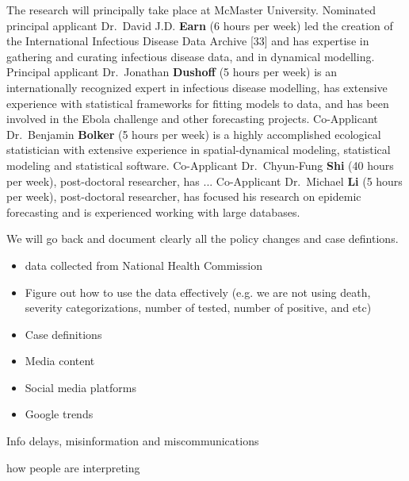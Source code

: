 The research will principally take place at McMaster University. 
Nominated principal applicant Dr.\ David J.D. \textbf{Earn} (6 hours per week) led the creation of the International Infectious Disease Data Archive [33] and has expertise in gathering and curating infectious disease data, and in dynamical modelling.
Principal applicant Dr.\ Jonathan \textbf{Dushoff} (5 hours per week) is an internationally recognized expert in infectious disease modelling, has extensive experience with statistical frameworks for fitting models to data, and has been involved in the Ebola challenge and other forecasting projects. 
Co-Applicant Dr.\ Benjamin \textbf{Bolker} (5 hours per week) is a highly accomplished ecological statistician with extensive experience in spatial-dynamical modeling, statistical modeling and statistical software.
Co-Applicant Dr.\ Chyun-Fung \textbf{Shi} (40 hours per week), post-doctoral researcher, has ...
Co-Applicant Dr.\ Michael \textbf{Li} (5 hours per week), post-doctoral researcher, has focused his research on epidemic forecasting and is experienced working with large databases. 








We will go back and document clearly all the policy changes and case defintions. 

\begin{itemize}
\item{data collected from National Health Commission}
\item{Figure out how to use the data effectively (e.g. we are not using death, severity categorizations, number of tested, number of positive, and etc)}
\item{Case definitions}
\item{Media content}
\item{Social media platforms}
\item{Google trends}
\end{itemize}


Info delays, misinformation and miscommunications


how people are interpreting 



